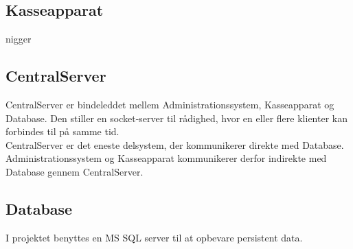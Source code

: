\subsection{Kasseapparat}
nigger


\subsection{CentralServer}
CentralServer er bindeleddet mellem Administrationssystem, Kasseapparat og Database. Den stiller en socket-server til rådighed, hvor en eller flere klienter kan forbindes til på samme tid.\\

CentralServer er det eneste delsystem, der kommunikerer direkte med Database. Administrationssystem og Kasseapparat kommunikerer derfor indirekte med Database gennem CentralServer.

\subsection{Database}
I projektet benyttes en MS SQL server til at opbevare persistent data.
